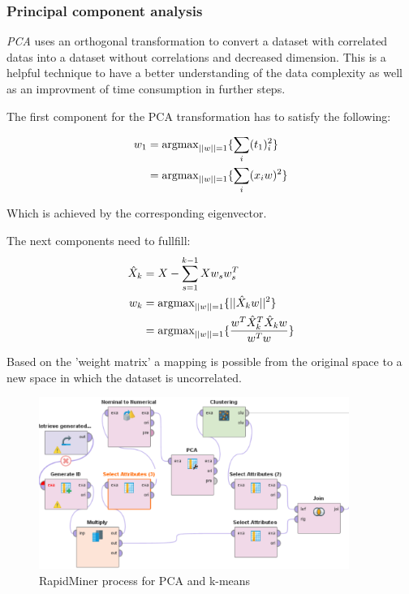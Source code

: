 \subsubsection{Principal component analysis}

\textit{PCA} uses an orthogonal transformation to convert a dataset with correlated datas into a dataset without correlations and decreased dimension. This is a helpful technique to have a better understanding of the data complexity as well as an improvment of time consumption in further steps.

The first component for the PCA transformation has to satisfy the following:

\vspace*{-1em}
\begin{align*}
w_1 &= \text{argmax}_{||w|| = 1} \{\sum_i (t_1)_i^2\}\\
	&= \text{argmax}_{||w|| = 1} \{\sum_i (x_iw)^2\}
	\vspace*{-2em}
\end{align*}


Which is achieved by the corresponding eigenvector.

The next components need to fullfill:
\begin{align*}
\hat{X}_k &= X - \sum_{s=1}^{k-1} Xw_sw_s^T\\
w_k &= \text{argmax}_{||w|| = 1} \{||\hat{X}_kw||^2\}\\
	&= \text{argmax}_{||w|| = 1} \{\frac{w^T\hat{X}_k^T\hat{X}_kw}{w^Tw}\}
	\vspace*{-1em}
\end{align*}

Based on the 'weight matrix' a mapping is possible from the original space to a new space in which the dataset is uncorrelated. 
	
	\vspace*{-1em}
	\begin{figure}[H]
	\centering
	\includegraphics[width=0.9\textwidth]{PCAClustering}
	\caption{RapidMiner process for PCA and k-means}
	\label{fig:PCA}
	\vspace*{-2em}
	\end{figure}

